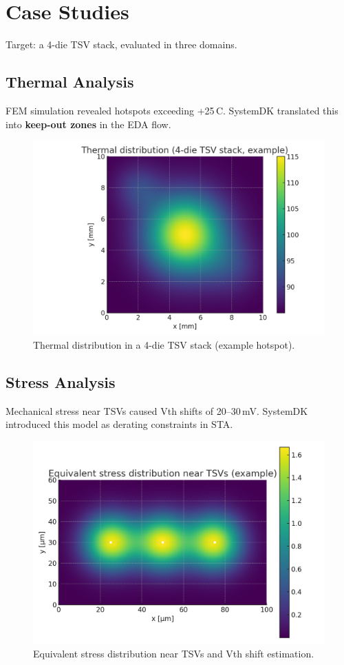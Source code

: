 \documentclass[conference]{IEEEtran}
\begin{document}
\section{Case Studies}
Target: a 4-die TSV stack, evaluated in three domains.

\subsection{Thermal Analysis}
FEM simulation revealed hotspots exceeding +25\,\textdegree C.
SystemDK translated this into \textbf{keep-out zones} in the EDA flow.

\begin{figure}[htbp]
  \centering
  \includegraphics[width=0.8\linewidth]{thermal_map}
  \caption{Thermal distribution in a 4-die TSV stack (example hotspot).}
  \label{fig:thermal}
\end{figure}

\subsection{Stress Analysis}
Mechanical stress near TSVs caused Vth shifts of 20--30\,mV.
SystemDK introduced this model as derating constraints in STA.

\begin{figure}[htbp]
  \centering
  \includegraphics[width=0.8\linewidth]{stress_map}
  \caption{Equivalent stress distribution near TSVs and Vth shift estimation.}
  \label{fig:stress}
\end{figure}
\end{document}
